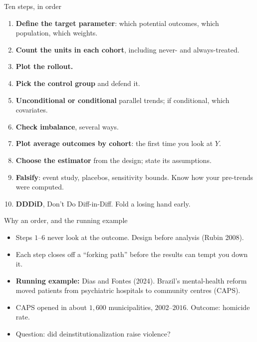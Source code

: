 \documentclass[
  11pt,
  ignorenonframetext,
  aspectratio=169,
]{beamer}
\providecommand{\tightlist}{%
  \setlength{\itemsep}{0pt}\setlength{\parskip}{0pt}}
\begin{document}
\begin{frame}{Ten steps, in order}
\protect{}\label{ten-steps-in-order}
\begin{enumerate}
\tightlist
\item
  \textbf{Define the target parameter}: which potential outcomes, which
  population, which weights.
\item
  \textbf{Count the units in each cohort}, including never- and
  always-treated.
\item
  \textbf{Plot the rollout.}
\item
  \textbf{Pick the control group} and defend it.
\item
  \textbf{Unconditional or conditional} parallel trends; if conditional,
  which covariates.
\item
  \textbf{Check imbalance}, several ways.
\item
  \textbf{Plot average outcomes by cohort}: the first time you look at
  \(Y\).
\item
  \textbf{Choose the estimator} from the design; state its assumptions.
\item
  \textbf{Falsify}: event study, placebos, sensitivity bounds. Know how
  your pre-trends were computed.
\item
  \textbf{DDDiD}, Don't Do Diff-in-Diff. Fold a losing hand early.
\end{enumerate}
\end{frame}

\begin{frame}{Why an order, and the running example}
\protect{}\label{why-an-order-and-the-running-example}
\begin{itemize}
\tightlist
\item
  Steps \(1\)--\(6\) never look at the outcome. Design before analysis
  (Rubin 2008).
\item
  Each step closes off a ``forking path'' before the results can tempt
  you down it.
\end{itemize}

\vspace{0.4em}

\begin{itemize}
\tightlist
\item
  \textbf{Running example:} Dias and Fontes (2024). Brazil's
  mental-health reform moved patients from psychiatric hospitals to
  community centres (CAPS).
\item
  CAPS opened in about \(1{,}600\) municipalities, \(2002\)--\(2016\).
  Outcome: homicide rate.
\item
  Question: did deinstitutionalization raise violence?
\end{itemize}
\end{frame}
\end{document}
